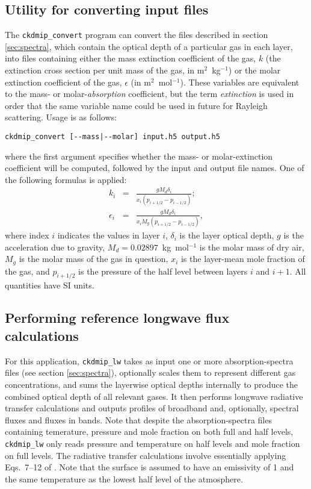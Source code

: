 \documentclass[twoside]{article}
\def\codesize{\small}
\def\code#1{{\codesize\texttt{#1}}}
\begin{document}
\subsection{Utility for converting input files}
\label{sec:convert}
The \code{ckdmip\_convert} program can convert the files described in
section \ref{sec:spectra}, which contain the optical depth of a
particular gas in each layer, into files containing either the mass
extinction coefficient of the gas, $k$ (the extinction cross section
per unit mass of the gas, in m$^2$~kg$^{-1}$) or the molar extinction
coefficient of the gas, $\epsilon$ (in m$^2$~mol$^{-1}$). These
variables are equivalent to the mass- or molar-\emph{absorption}
coefficient, but the term \emph{extinction} is used in order that the
same variable name could be used in future for Rayleigh scattering.
Usage is as follows:
\begin{verbatim}
ckdmip_convert [--mass|--molar] input.h5 output.h5
\end{verbatim}
where the first argument specifies whether the mass- or
molar-extinction coefficient will be computed, followed by the input
and output file names.  One of the following formulas is applied:
%
\begin{eqnarray}
k_i&=&\frac{gM_d\delta_i}{x_i\left(p_{i+1/2}-p_{i-1/2}\right)};\\
\epsilon_i&=&\frac{gM_d\delta_i}{x_iM_g\left(p_{i+1/2}-p_{i-1/2}\right)},
\end{eqnarray}
%
where index $i$ indicates the values in layer $i$, $\delta_i$ is the
layer optical depth, $g$ is the acceleration due to gravity,
$M_d=0.02897$~kg~mol$^{-1}$ is the molar mass of dry air, $M_g$ is the
molar mass of the gas in question, $x_i$ is the layer-mean mole
fraction of the gas, and $p_{i+1/2}$ is the pressure of the half level
between layers $i$ and $i+1$.  All quantities have SI units.

\subsection{Performing reference longwave flux calculations}
\label{sec:lbl}
For this application, \code{ckdmip\_lw} takes as input one or more
absorption-spectra files (see section \ref{sec:spectra}), optionally
scales them to represent different gas concentrations, and sums the
layerwise optical depths internally to produce the combined optical
depth of all relevant gases. It then performs longwave radiative
transfer calculations and outputs profiles of broadband and,
optionally, spectral fluxes and fluxes in bands. Note that despite the
absorption-spectra files containing temerature, pressure and mole
fraction on both full and half levels, \code{ckdmip\_lw} only reads
pressure and temperature on half levels and mole fraction on full
levels. The radiative transfer calculations involve essentially
applying Eqs.\ 7--12 of \cite{Hogan&2018}. Note that the surface is
assumed to have an emissivity of 1 and the same temperature as the
lowest half level of the atmosphere.
\end{document}
